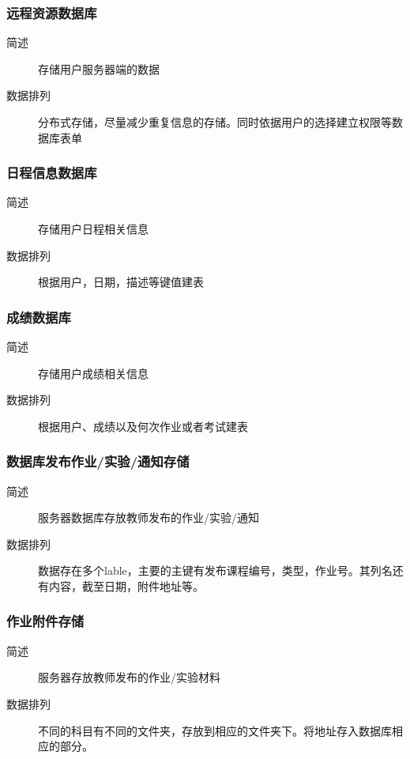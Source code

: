 \subsubsection{远程资源数据库}
\begin{description}
  \item[简述] 存储用户服务器端的数据
  \item[数据排列] 分布式存储，尽量减少重复信息的存储。同时依据用户的选择建立权限等数据库表单
\end{description}
\subsubsection{日程信息数据库}
\begin{description}
  \item[简述] 存储用户日程相关信息
  \item[数据排列] 根据用户，日期，描述等键值建表
\end{description}
\subsubsection{成绩数据库}
\begin{description}
  \item[简述] 存储用户成绩相关信息
  \item[数据排列] 根据用户、成绩以及何次作业或者考试建表
\end{description}
\subsubsection{数据库发布作业/实验/通知存储}
\begin{description}
  \item[简述] 服务器数据库存放教师发布的作业/实验/通知
  \item[数据排列] 数据存在多个lable，主要的主键有发布课程编号，类型，作业号。其列名还有内容，截至日期，附件地址等。
\end{description}

\subsubsection{作业附件存储}
\begin{description}
  \item[简述] 服务器存放教师发布的作业/实验材料
  \item[数据排列] 不同的科目有不同的文件夹，存放到相应的文件夹下。将地址存入数据库相应的部分。
\end{description}

